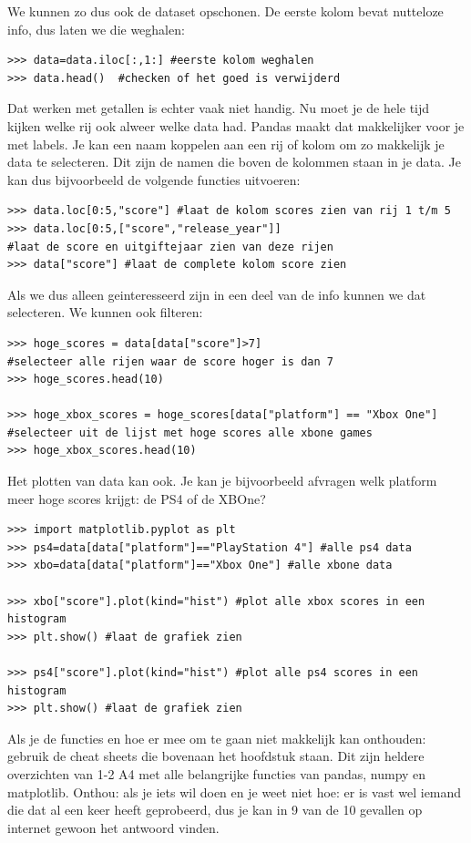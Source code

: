 We kunnen zo dus ook de dataset opschonen. De eerste kolom bevat nutteloze info, dus laten we die weghalen:
\begin{lstlisting}[frame=single]
>>> data=data.iloc[:,1:] #eerste kolom weghalen
>>> data.head()  #checken of het goed is verwijderd
\end{lstlisting}

Dat werken met getallen is echter vaak niet handig. Nu moet je de hele tijd kijken welke rij ook alweer welke data had. Pandas maakt dat makkelijker voor je met labels. Je kan een naam koppelen aan een rij of kolom om zo makkelijk je data te selecteren. Dit zijn de namen die boven de kolommen staan in je data. Je kan dus bijvoorbeeld de volgende functies uitvoeren:
\begin{lstlisting}[frame=single]
>>> data.loc[0:5,"score"] #laat de kolom scores zien van rij 1 t/m 5
>>> data.loc[0:5,["score","release_year"]] 
#laat de score en uitgiftejaar zien van deze rijen
>>> data["score"] #laat de complete kolom score zien
\end{lstlisting}

Als we dus alleen geinteresseerd zijn in een deel van de info kunnen we dat selecteren. We kunnen ook filteren:
\begin{lstlisting}[frame=single]
>>> hoge_scores = data[data["score"]>7] 
#selecteer alle rijen waar de score hoger is dan 7
>>> hoge_scores.head(10)

>>> hoge_xbox_scores = hoge_scores[data["platform"] == "Xbox One"] 
#selecteer uit de lijst met hoge scores alle xbone games
>>> hoge_xbox_scores.head(10)
\end{lstlisting}

Het plotten van data kan ook. Je kan je bijvoorbeeld afvragen welk platform meer hoge scores krijgt: de PS4 of de XBOne?

\begin{lstlisting}[frame=single]
>>> import matplotlib.pyplot as plt
>>> ps4=data[data["platform"]=="PlayStation 4"] #alle ps4 data
>>> xbo=data[data["platform"]=="Xbox One"] #alle xbone data

>>> xbo["score"].plot(kind="hist") #plot alle xbox scores in een histogram
>>> plt.show() #laat de grafiek zien

>>> ps4["score"].plot(kind="hist") #plot alle ps4 scores in een histogram
>>> plt.show() #laat de grafiek zien
\end{lstlisting}

Als je de functies en hoe er mee om te gaan niet makkelijk kan onthouden: gebruik de cheat sheets die bovenaan het hoofdstuk staan. Dit zijn heldere overzichten van 1-2 A4 met alle belangrijke functies van pandas, numpy en matplotlib. Onthou: als je iets wil doen en je weet niet hoe: er is vast wel iemand die dat al een keer heeft geprobeerd, dus je kan in 9 van de 10 gevallen op internet gewoon het antwoord vinden. 

